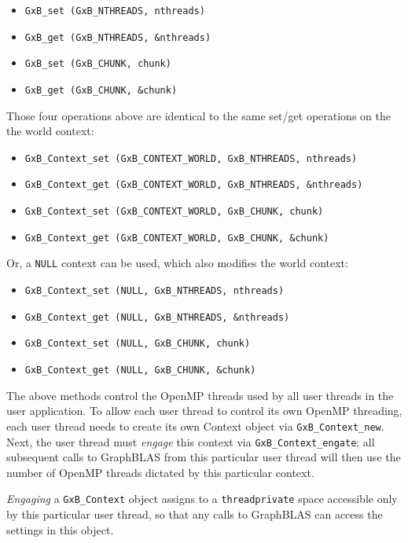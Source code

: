 \documentclass[12pt]{article}
\begin{document}
    \begin{itemize}
    \item \verb'GxB_set (GxB_NTHREADS, nthreads)'
    \item \verb'GxB_get (GxB_NTHREADS, &nthreads)'
    \item \verb'GxB_set (GxB_CHUNK, chunk)'
    \item \verb'GxB_get (GxB_CHUNK, &chunk)'
    \end{itemize}

Those four operations above are identical to the same set/get operations on the
the world context:

    \begin{itemize}
    \item \verb'GxB_Context_set (GxB_CONTEXT_WORLD, GxB_NTHREADS, nthreads)'
    \item \verb'GxB_Context_get (GxB_CONTEXT_WORLD, GxB_NTHREADS, &nthreads)'
    \item \verb'GxB_Context_set (GxB_CONTEXT_WORLD, GxB_CHUNK, chunk)'
    \item \verb'GxB_Context_get (GxB_CONTEXT_WORLD, GxB_CHUNK, &chunk)'
    \end{itemize}

Or, a \verb'NULL' context can be used, which also modifies the world context:

    \begin{itemize}
    \item \verb'GxB_Context_set (NULL, GxB_NTHREADS, nthreads)'
    \item \verb'GxB_Context_get (NULL, GxB_NTHREADS, &nthreads)'
    \item \verb'GxB_Context_set (NULL, GxB_CHUNK, chunk)'
    \item \verb'GxB_Context_get (NULL, GxB_CHUNK, &chunk)'
    \end{itemize}

The above methods control the OpenMP threads used by all user threads in the
user application.  To allow each user thread to control its own OpenMP
threading, each user thread needs to create its own Context object via
\verb'GxB_Context_new'.  Next, the user thread must {\em engage} this context
via \verb'GxB_Context_engate'; all subsequent calls to GraphBLAS from this
particular user thread will then use the number of OpenMP threads dictated by
this particular context.

{\em Engaging} a \verb'GxB_Context' object assigns to a \verb'threadprivate'
space accessible only by this particular user thread, so that any calls to
GraphBLAS can access the settings in this object.
\end{document}
